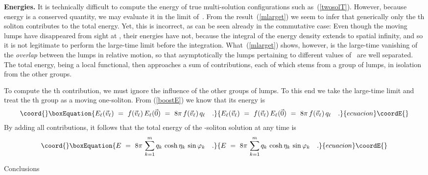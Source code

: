 \documentclass[a4paper,11pt]{article}
\makeatletter
\renewcommand{\section}{\@startsection{section}{1}{0pt}{\medskipamount}
{\medskipamount}{\large\bf}}
\numberwithin{equation}{section}
\makeatother
\begin{document}
\noindent
{\bf Energies.}
It is technically difficult to compute the energy
of true multi-solution configurations such as~(\ref{twosolT}).
However, because energy is a conserved quantity, we may evaluate it in
the limit of~\coordHE{}.
{}From the result~(\ref{mlarget}) we seem to infer that generically
only the \myHighlight{$\ell$}\coordHE{}th soliton contributes to the total energy.
Yet, this is incorrect, as can be seen already in the
commutative case: Even though the moving lumps have disappeared from sight
at \coordHE{}, their energies have not, because the integral of the energy
density extends to spatial infinity, and so it is not legitimate to
perform the large-time limit before the integration.
What~(\ref{mlarget}) shows, however, is the large-time vanishing of the
{\it overlap\/} between the lumps in relative motion, so that asymptotically
the lumps pertaining to different values of~\coordHE{} are well separated.
The total energy, being a local functional, then approaches a sum of \coordHE{}
contributions, each of which stems from a group of \coordHE{} lumps, in isolation
from the other groups.

To compute the \myHighlight{$\ell$}\coordHE{}th contribution, we must ignore the influence of the
other groups of lumps. To this end we take the large-time limit and treat
the \myHighlight{$\ell$}\coordHE{}th group as a moving one-soliton.
{}From (\ref{boostE}) we know that its energy is
\begin{equation}\coord{}\boxEquation{ \label{energyell}
E_\ell(\vec v_\ell)\ =\ f(\vec v_\ell)\,E_\ell(\vec 0)\ =\
8\pi\, f(\vec v_\ell)\,q_\ell \quad.
}{ E_\ell(\vec v_\ell)\ =\ f(\vec v_\ell)\,E_\ell(\vec 0)\ =\
8\pi\, f(\vec v_\ell)\,q_\ell \quad.
}{ecuacion}\coordE{}\end{equation}
By adding all contributions,
it follows that the total energy of the \coordHE{}-soliton solution at any time is
\begin{equation}\coord{}\boxEquation{
E\ =\ 8\pi\,\sum_{k=1}^m
q_k\,\cosh\eta_k\,\sin\varphi_k  \quad.
}{
E\ =\ 8\pi\,\sum_{k=1}^m
q_k\,\cosh\eta_k\,\sin\varphi_k  \quad.
}{ecuacion}\coordE{}\end{equation}


\section{Conclusions}
\end{document}
